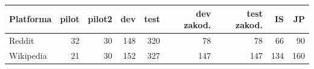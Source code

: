 \begin{tabular}{lrrrrrrrr}
\toprule
Platforma & pilot & pilot2 & dev & test & dev zakod. & test zakod. & IS & JP \\
\midrule
Reddit & 32 & 30 & 148 & 320 & 78 & 78 & 66 & 90 \\
Wikipedia & 21 & 30 & 152 & 327 & 147 & 147 & 134 & 160 \\
\bottomrule
\end{tabular}
